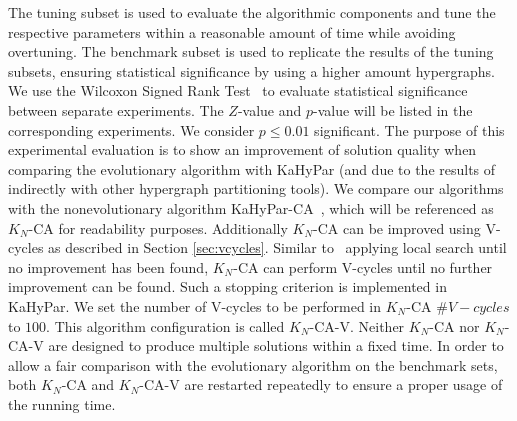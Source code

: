 \documentclass[a4paper,12pt,titlepage, BCOR7mm,headsepline]{scrbook}
\numberwithin{equation}{section}
\begin{document}
The tuning subset is used to evaluate the algorithmic components and tune the respective parameters within a reasonable amount of time while avoiding overtuning. 
The benchmark subset is used to replicate the results of the tuning subsets, ensuring statistical significance by using a higher amount hypergraphs. 
We use the Wilcoxon Signed Rank Test~\cite{wilcoxon1945individual} to evaluate statistical significance between separate experiments. The $Z$-value and $p$-value will be listed in the corresponding experiments. We consider $p \le 0.01$ significant.
The purpose of this experimental evaluation is to show an improvement of solution quality when comparing the evolutionary algorithm with KaHyPar (and due to the results of~\cite{akhremtsev2017engineering} indirectly with other hypergraph partitioning tools).
We compare our algorithms with the nonevolutionary algorithm KaHyPar-CA~\cite{heuer2017improving}, which will be referenced as $K_N$-CA for readability purposes.
Additionally $K_N$-CA can be improved using V-cycles as described in Section \ref{sec:vcycles}. Similar to~\cite{armstrong2010investigation} applying local search until no improvement has been found, $K_N$-CA can perform V-cycles until no further improvement can be found. Such a stopping criterion is implemented in KaHyPar. We set the number of V-cycles to be performed in $K_N$-CA $\#V-cycles$ to $100$. This algorithm configuration is called $K_N$-CA-V.
Neither $K_N$-CA nor $K_N$-CA-V are designed to produce multiple solutions within a fixed time. In order to allow a fair comparison with the evolutionary algorithm on the benchmark sets, both $K_N$-CA and $K_N$-CA-V are restarted repeatedly to ensure a proper usage of the running time.

\end{document}
